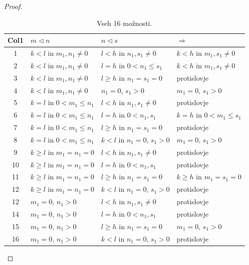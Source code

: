 \documentclass[mat2]{fmfdelo}
\begin{document}
\begin{proof}
\begin{table}[h!]
\centering
\begin{tabular}{||c | l | l | l||} 
 \hline
 Col1 & $m \triangleleft n$ & $n \triangleleft s$ & $\Rightarrow$ \\ [0.5ex] 
 \hline\hline
 1 & $k<l$ in $m_1, n_1 \neq 0$ & $l<h$ in $n_1, s_1 \neq 0$ & $k<h$ in $m_1, s_1 \neq 0$ \\ 
 2 & $k<l$ in $m_1, n_1 \neq 0$ & $l=h$ in $0<n_1 \leq s_1$ & $k<h$ in $m_1, s_1 \neq 0$ \\
 3 & $k<l$ in $m_1, n_1 \neq 0$ & $l \geq h$ in $n_1 = s_1 = 0$ & protislovje \\
 4 & $k<l$ in $m_1, n_1 \neq 0$ & $n_1 = 0$, $s_1 > 0$ & $m_1 = 0$, $s_1 > 0$ \\
 5 & $k=l$ in $0<m_1 \leq n_1$ & $l<h$ in $n_1, s_1 \neq 0$ & protislovje \\ 
 6 & $k=l$ in $0<m_1 \leq n_1$ & $l=h$ in $0<n_1, s_1$ & $k=h$ in $0<m_1 \leq s_1$ \\
 7 & $k=l$ in $0<m_1 \leq n_1$ & $l \geq h$ in $n_1 = s_1 = 0$ & protislovje \\
 8 & $k=l$ in $0<m_1 \leq n_1$ & $k<l$ in $n_1 = 0$, $s_1 > 0$ & $m_1 = 0$, $s_1 > 0$ \\
 9 & $k \geq l$ in $m_1 = n_1 = 0$ & $l<h$ in $n_1, s_1 \neq 0$ & protislovje \\ 
 10 & $k \geq l$ in $m_1 = n_1 = 0$ & $l=h$ in $0<n_1, s_1$ & protislovje \\
 11 & $k \geq l$ in $m_1 = n_1 = 0$ & $l \geq h$ in $n_1 = s_1 = 0$ & $k \geq h$ in $m_1 = s_1 = 0$ \\
 12 & $k \geq l$ in $m_1 = n_1 = 0$ & $k<l$ in $n_1 = 0$, $s_1 > 0$ & protislovje \\
 12 & $m_1 = 0$, $n_1 > 0$ & $l<h$ in $n_1, s_1 \neq 0$ & protislovje \\ 
 14 & $m_1 = 0$, $n_1 > 0$ & $l=h$ in $0<n_1, s_1$ & protislovje \\
 15 & $m_1 = 0$, $n_1 > 0$ & $l \geq h$ in $n_1 = s_1 = 0$ & $m_1 = 0$, $s_1 > 0$ \\
 16 & $m_1 = 0$, $n_1 > 0$ & $k<l$ in $n_1 = 0$, $s_1 > 0$ & protislovje \\[1ex] 
 \hline
\end{tabular}
\caption{Vseh 16 možnosti.}
\label{table:1}
\end{table}


\end{proof}
\end{document}
